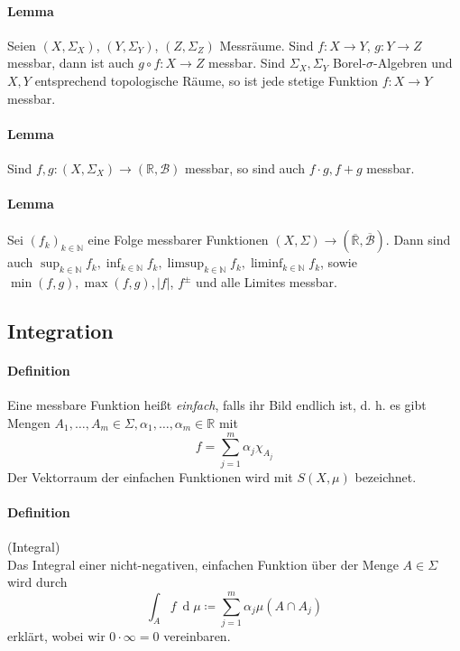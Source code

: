 \documentclass[12pt,a4paper,fleqn]{article}
\def\d{{\operatorname{d}}}
\begin{document}
\paragraph{Lemma} Seien $(X, \Sigma_X)$, $(Y, \Sigma_Y)$, $(Z, \Sigma_Z)$ Messräume. Sind $f\colon X \rightarrow Y$, ${g: Y \rightarrow Z}$ messbar, dann ist auch $g \circ f\colon X \rightarrow Z$ messbar. Sind $\Sigma_X, \Sigma_Y$ Borel-$\sigma$-Algebren und $X, Y$ entsprechend topologische Räume, so ist jede stetige Funktion $f\colon X \rightarrow Y$ messbar.

\paragraph{Lemma} Sind $f, g: (X, \Sigma_X) \rightarrow (\mathbb{R}, \mathcal{B})$ messbar, so sind auch $f \cdot g, f+g$ messbar.

\paragraph{Lemma} Sei $(f_k)_{k \in \mathbb{N}}$ eine Folge messbarer Funktionen $(X, \Sigma) \rightarrow (\overline{\mathbb{R}}, \overline{\mathcal{B}})$. Dann sind auch $\sup_{k \in \mathbb{N}} f_k, \inf_{k \in \mathbb{N}} f_k, \limsup_{k \in \mathbb{N}} f_k, \liminf_{k \in \mathbb{N}} f_k$, sowie $\min(f, g), \max(f, g), \vert f \vert$, $f^\pm$ und alle Limites messbar.

\subsection{Integration}

\paragraph{Definition} Eine messbare Funktion heißt \textit{einfach}, falls ihr Bild endlich ist, d. h. es gibt Mengen $A_1, \dots, A_m \in \Sigma, \alpha_1, \dots, \alpha_m \in \mathbb{R}$ mit
\begin{displaymath}
f = \sum \limits _{j = 1}^m \alpha_j \chi_{A_j}
\end{displaymath}
Der Vektorraum der einfachen Funktionen wird mit $S(X, \mu)$ bezeichnet.

\paragraph{Definition} (Integral)\\
Das Integral einer nicht-negativen, einfachen Funktion über der Menge $A \in \Sigma$ wird durch
\begin{displaymath}
\int_A f\ \d\mu \coloneqq \sum \limits _{j = 1}^m \alpha_j \mu(A \cap A_j)
\end{displaymath}
erklärt, wobei wir $0 \cdot \infty = 0$ vereinbaren.
\end{document}
